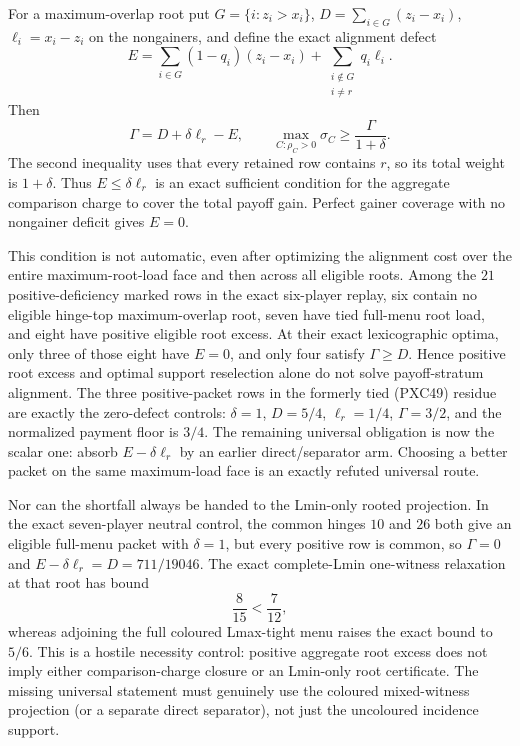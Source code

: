 \documentclass[11pt]{article}
\begin{document}
For a maximum-overlap root put
$G=\{i:z_i>x_i\}$,
$D=\sum_{i\in G}(z_i-x_i)$,
$\ell_i=x_i-z_i$ on the nongainers, and define the exact alignment defect
\[
 E=\sum_{i\in G}(1-q_i)(z_i-x_i)
   +\sum_{\substack{i\notin G\\i\ne r}}q_i\ell_i .
\]
Then
\[
 \Gamma=D+\delta\ell_r-E,
 \qquad
 \max_{C:\rho_C>0}\sigma_C\ge \frac{\Gamma}{1+\delta}. \tag{PXC51}
\]
The second inequality uses that every retained row contains $r$, so its
total weight is $1+\delta$.  Thus $E\le\delta\ell_r$ is an exact sufficient
condition for the aggregate comparison charge to cover the total payoff
gain.  Perfect gainer coverage with no nongainer deficit gives $E=0$.

This condition is not automatic, even after optimizing the alignment cost
over the entire maximum-root-load face and then across all eligible roots.
Among the $21$ positive-deficiency marked rows in the exact six-player
replay, six contain no eligible hinge-top maximum-overlap root, seven have
tied full-menu root load, and eight have positive eligible root excess.  At
their exact lexicographic optima, only three of those eight have $E=0$, and
only four satisfy $\Gamma\ge D$.  Hence positive root excess and optimal
support reselection alone do not solve payoff-stratum alignment.  The three positive-packet rows in
the formerly tied (PXC49) residue are exactly the zero-defect controls:
$\delta=1$, $D=5/4$, $\ell_r=1/4$, $\Gamma=3/2$, and the normalized
payment floor is $3/4$.  The remaining universal obligation is now the
scalar one: absorb $E-\delta\ell_r$ by an earlier direct/separator arm.
Choosing a better packet on the same maximum-load face is an exactly refuted
universal route.

Nor can the shortfall always be handed to the Lmin-only rooted projection.
In the exact seven-player neutral control, the common hinges $10$ and $26$
both give an eligible full-menu packet with $\delta=1$, but every positive
row is common, so $\Gamma=0$ and
$E-\delta\ell_r=D=711/19046$.  The exact complete-Lmin one-witness
relaxation at that root has bound
\[
 \frac{8}{15}<\frac{7}{12},
\]
whereas adjoining the full coloured Lmax-tight menu raises the exact bound
to $5/6$.  This is a hostile necessity control: positive aggregate root
excess does not imply either comparison-charge closure or an Lmin-only root
certificate.  The missing universal statement must genuinely use the
coloured mixed-witness projection (or a separate direct separator), not just
the uncoloured incidence support.
\end{document}
